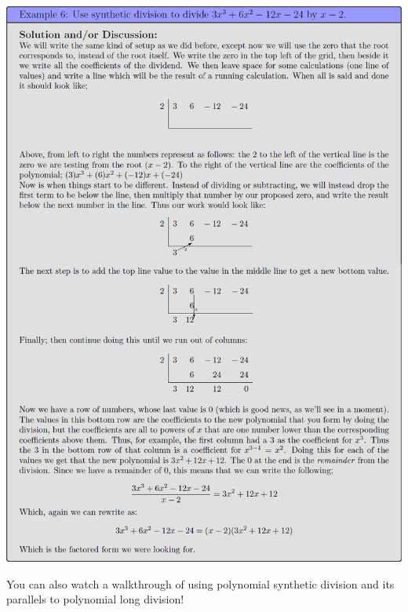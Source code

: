 \documentclass{ximeraXloud}
\begin{document}
\begin{image}
    \includegraphics[width=\textwidth]{exPolySyntheticDivision.png}
\end{image}%


You can also watch a walkthrough of using polynomial synthetic division and its parallels to polynomial long division!

\end{document}
